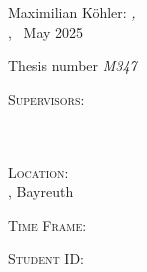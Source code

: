 
\thispagestyle{empty}

\hfill

\vfill

    Maximilian Köhler: \textit{\titel,} \\
    \arbeit, \textcopyright~May 2025

    \medskip
    Thesis number {\itshape M347}

    \bigskip

    \textsc{Supervisors}: \\
    \betreuer \\
    \betreuerzwei \\ 
    \gutachter

    \medskip

    \textsc{Location}: \\
    \abgabeort, Bayreuth

    \medskip

    \textsc{Time Frame}: \\
    \zeitraum

    \medskip
    \textsc{Student ID}: \\
    \matrikelnr


